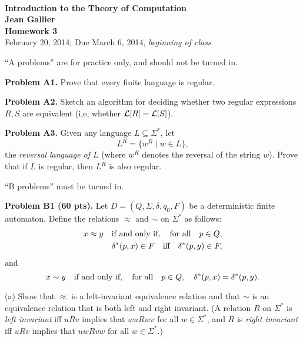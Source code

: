 \documentclass[12pt]{article}
\begin{document}
\begin{center}
\\
\vspace{1cm}
{\Large\bf Introduction to the Theory of Computation\\
Jean Gallier \\
\vspace{0.5cm}
Homework 3}\\[10pt]
February 20, 2014; Due March 6, 2014, {\it beginning of class}\\
\end{center}

``A problems'' are for practice only, and should not
be turned in.


\vspace {0.25cm}
\noindent
{\bf Problem A1.} 
Prove that every finite language is regular.

\vspace {0.25cm}\noindent
{\bf Problem A2.} 
Sketch an algorithm for deciding whether two regular
expressions $R, S$ are equivalent
(i,e, whether ${\cal L}[R] = {\cal L}[S]$).

\vspace {0.25cm}\noindent
{\bf Problem A3.} 
Given any language $L\subseteq \Sigma^*$, let
\[L^R = \{w^R \mid w \in L\},\]
the {\it reversal language of $L$\/} (where $w^R$
denotes the reversal of the string $w$).
Prove that if $L$ is regular, then $L^R$
is also regular.

\vspace {0.5cm}
``B problems'' must be turned in.

\vspace {0.25cm}\noindent
{\bf Problem B1 (60 pts).} 
Let $D=(Q,\Sigma,\delta,q_{0},F)$ be a deterministic finite
automaton. Define the relations $\approx$ and $\sim$ on $\Sigma^{*}$
as follows:
\begin{align*}
x \approx y\quad&\hbox{if and only if},\quad\hbox{for all}\quad p\in Q,\\
& \delta^{*}(p,x) \in F\quad\hbox{iff}\quad \delta^{*}(p,y) \in F,
\end{align*}
and
$$x \sim y\quad\hbox{if and only if},\quad\hbox{for all}\quad p\in Q,\quad
 \delta^{*}(p,x) = \delta^{*}(p,y).$$

\medskip
(a) Show that $\approx$ is a left-invariant equivalence relation
and that $\sim$ is an equivalence relation
that is both left and right invariant.
(A relation $R$ on $\Sigma^{*}$ is {\it left invariant\/}
iff $uRv$ implies that $wuRwv$ for all $w \in \Sigma^{*}$,
and $R$ is {\it right invariant\/} iff $uRv$ implies that
$uwRvw$ for all $w \in \Sigma^{*}$.)
\end{document}
